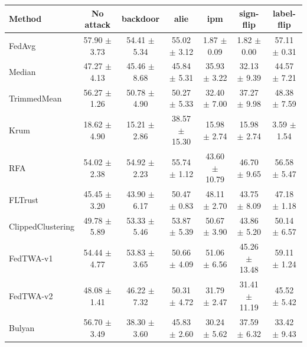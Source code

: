 \begin{tabular}{lcccccc}
\toprule
Method & No attack & backdoor & alie & ipm & sign-flip & label-flip \\
\midrule
FedAvg & 57.90 $\pm$ 3.73 & 54.41 $\pm$ 5.34 & 55.02 $\pm$ 3.12 & 1.87 $\pm$ 0.09 & 1.82 $\pm$ 0.00 & 57.11 $\pm$ 0.31 \\
Median & 47.27 $\pm$ 4.13 & 45.46 $\pm$ 8.68 & 45.84 $\pm$ 5.31 & 35.93 $\pm$ 3.22 & 32.13 $\pm$ 9.39 & 44.57 $\pm$ 7.21 \\
TrimmedMean & 56.27 $\pm$ 1.26 & 50.78 $\pm$ 4.90 & 50.27 $\pm$ 5.33 & 32.40 $\pm$ 7.00 & 37.27 $\pm$ 9.98 & 48.38 $\pm$ 7.59 \\
Krum & 18.62 $\pm$ 4.90 & 15.21 $\pm$ 2.86 & 38.57 $\pm$ 15.30 & 15.98 $\pm$ 2.74 & 15.98 $\pm$ 2.74 & 3.59 $\pm$ 1.54 \\
RFA & 54.02 $\pm$ 2.38 & 54.92 $\pm$ 2.23 & 55.74 $\pm$ 1.12 & 43.60 $\pm$ 10.79 & 46.70 $\pm$ 9.65 & 56.58 $\pm$ 5.47 \\
FLTrust & 45.45 $\pm$ 3.20 & 43.90 $\pm$ 6.17 & 50.47 $\pm$ 0.83 & 48.11 $\pm$ 2.70 & 43.75 $\pm$ 8.09 & 47.18 $\pm$ 1.18 \\
ClippedClustering & 49.78 $\pm$ 5.89 & 53.33 $\pm$ 5.46 & 53.87 $\pm$ 5.39 & 50.67 $\pm$ 3.90 & 43.86 $\pm$ 5.20 & 50.14 $\pm$ 6.57 \\
FedTWA-v1 & 54.44 $\pm$ 4.77 & 53.83 $\pm$ 3.65 & 50.66 $\pm$ 4.09 & 51.06 $\pm$ 6.56 & 45.26 $\pm$ 13.48 & 59.11 $\pm$ 1.24 \\
FedTWA-v2 & 48.08 $\pm$ 1.41 & 46.22 $\pm$ 7.32 & 50.31 $\pm$ 4.72 & 31.79 $\pm$ 2.47 & 31.41 $\pm$ 11.19 & 45.52 $\pm$ 5.42 \\
Bulyan & 56.70 $\pm$ 3.49 & 38.30 $\pm$ 3.60 & 45.83 $\pm$ 2.60 & 30.24 $\pm$ 5.62 & 37.59 $\pm$ 6.32 & 33.42 $\pm$ 9.43 \\
\bottomrule
\end{tabular}